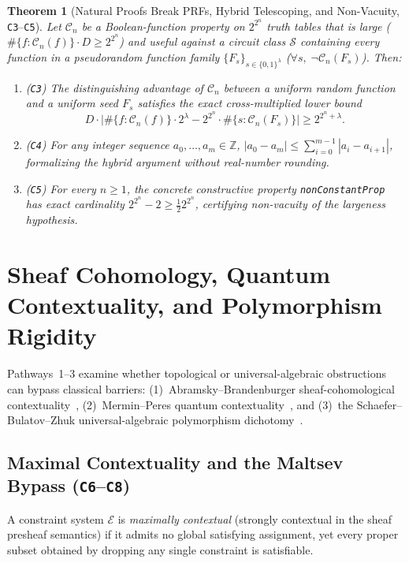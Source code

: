 \documentclass[11pt,reqno]{amsart}
\newtheorem{theorem}{Theorem}[section]
\theoremstyle{definition}
\newcommand{\Z}{\mathbb{Z}}
\begin{document}
\begin{theorem}[Natural Proofs Break PRFs, Hybrid Telescoping, and Non-Vacuity, \texttt{C3}--\texttt{C5}]
\label{thm:natproofs}
Let $\mathcal{C}_n$ be a Boolean-function property on $2^{2^n}$ truth tables that is
\emph{large} ($\#\{f : \mathcal{C}_n(f)\} \cdot D \ge 2^{2^n}$) and \emph{useful} against
a circuit class $\mathcal{S}$ containing every function in a pseudorandom function family
$\{F_s\}_{s \in \{0,1\}^\lambda}$ ($\forall s,\; \neg \mathcal{C}_n(F_s)$). Then:
\begin{enumerate}[leftmargin=1.6em]
\item (\texttt{C3}) The distinguishing advantage of $\mathcal{C}_n$ between a uniform
      random function and a uniform seed $F_s$ satisfies the exact cross-multiplied lower
      bound
      \[
        D \cdot \bigl|\#\{f : \mathcal{C}_n(f)\}\cdot 2^\lambda - 2^{2^n}\cdot \#\{s : \mathcal{C}_n(F_s)\}\bigr| \ge 2^{2^n + \lambda}.
      \]
\item (\texttt{C4}) For any integer sequence $a_0,\dots,a_m \in \Z$,
      $|a_0 - a_m| \le \sum_{i=0}^{m-1} |a_i - a_{i+1}|$, formalizing the hybrid
      argument without real-number rounding.
\item (\texttt{C5}) For every $n \ge 1$, the concrete constructive property
      \texttt{nonConstantProp} has exact cardinality $2^{2^n} - 2 \ge \frac{1}{2} 2^{2^n}$,
      certifying non-vacuity of the largeness hypothesis.
\end{enumerate}
\end{theorem}

\section{Sheaf Cohomology, Quantum Contextuality, and Polymorphism Rigidity}
\label{sec:sheaf-poly}

Pathways~1--3 examine whether topological or universal-algebraic obstructions can bypass
classical barriers: (1)~Abramsky--Brandenburger sheaf-cohomological
contextuality~\cite{AbramskyBrandenburger2011}, (2)~Mermin--Peres quantum
contextuality~\cite{Mermin1990,Peres1990}, and (3)~the Schaefer--Bulatov--Zhuk
universal-algebraic polymorphism dichotomy~\cite{Schaefer1978,Bulatov2017,Zhuk2020}.

\subsection{Maximal Contextuality and the Maltsev Bypass (\texttt{C6}--\texttt{C8})}
A constraint system $\mathcal{E}$ is \emph{maximally contextual} (strongly contextual in
the sheaf presheaf semantics) if it admits no global satisfying assignment, yet every
proper subset obtained by dropping any single constraint is satisfiable.
\end{document}
